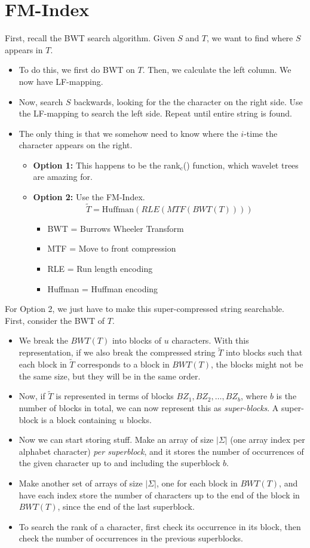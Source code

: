 \documentclass[10pt]{article}
\begin{document}
\section*{FM-Index}
First, recall the BWT search algorithm.  Given $S$ and $T$, we want to find where $S$ appears in $T$.  
\begin{itemize}
	\item To do this, we first do BWT on $T$.  Then, we calculate the left column.  We now have LF-mapping.
	\item Now, search $S$ backwards, looking for the the character on the right side.  Use the LF-mapping to search the left side.  Repeat until entire string is found.
	\item The only thing is that we somehow need to know where the $i$-time the character appears on the right.
	\begin{itemize}
	    \item \textbf{Option 1:} This happens to be the rank$_\text{c}$() function, which wavelet trees are amazing for.
	    \item \textbf{Option 2:} Use the FM-Index.
	    \[\tilde{T} = \text{Huffman}(RLE(MTF(BWT(T))))\]
        \begin{itemize}
            \item BWT = Burrows Wheeler Transform
            \item MTF = Move to front compression
            \item RLE = Run length encoding
            \item Huffman = Huffman encoding
        \end{itemize}
    \end{itemize}
\end{itemize}
For Option 2, we just have to make this super-compressed string searchable.  First, consider the BWT of $T$. 
\begin{itemize}
	\item We break the $BWT(T)$ into blocks of $u$ characters.  With this representation, if we also break the compressed string $\tilde{T}$ into blocks such that each block in $\tilde{T}$ corresponds to a block in $BWT(T)$, the blocks might not be the same size, but they will be in the same order.
	\item Now, if $\tilde{T}$ is represented in terms of blocks $BZ_1, BZ_2, \dots, BZ_b$, where $b$ is the number of blocks in total, we can now represent this as \textit{super-blocks}.  A super-block is a block containing $u$ blocks.
	\item Now we can start storing stuff.  Make an array of size $|\Sigma|$ (one array index per alphabet character) \textit{per superblock}, and it stores the number of occurrences of the given character up to and including the superblock $b$.
	\item Make another set of arrays of size $|\Sigma|$, one for each block in $BWT(T)$, and have each index store the number of characters up to the end of the block in $BWT(T)$, since the end of the last superblock.
	\item To search the rank of a character, first check its occurrence in its block, then check the number of occurrences in the previous superblocks.
\end{itemize}
\end{document}
